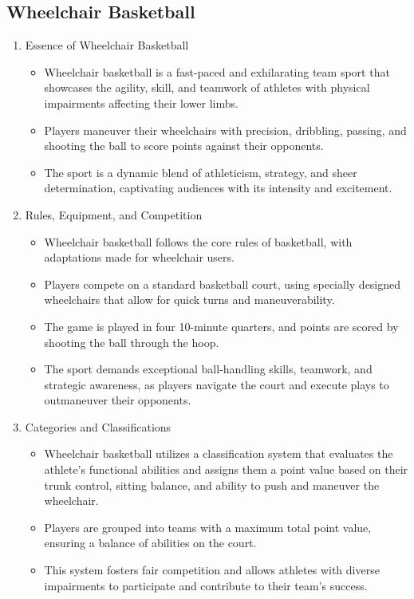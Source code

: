 \subsection{Wheelchair Basketball}

\begin{enumerate}

\item Essence of Wheelchair Basketball
    \begin{itemize}
    \item Wheelchair basketball is a fast-paced and exhilarating team sport that showcases the agility, skill, and teamwork of athletes with physical impairments affecting their lower limbs. 
    \item Players maneuver their wheelchairs with precision, dribbling, passing, and shooting the ball to score points against their opponents. 
    \item The sport is a dynamic blend of athleticism, strategy, and sheer determination, captivating audiences with its intensity and excitement.
    \end{itemize}

\item Rules, Equipment, and Competition
    \begin{itemize}
    \item Wheelchair basketball follows the core rules of basketball, with adaptations made for wheelchair users. 
    \item Players compete on a standard basketball court, using specially designed wheelchairs that allow for quick turns and maneuverability. 
    \item The game is played in four 10-minute quarters, and points are scored by shooting the ball through the hoop. 
    \item The sport demands exceptional ball-handling skills, teamwork, and strategic awareness, as players navigate the court and execute plays to outmaneuver their opponents.
    \end{itemize}

\item Categories and Classifications
    \begin{itemize}
    \item Wheelchair basketball utilizes a classification system that evaluates the athlete's functional abilities and assigns them a point value based on their trunk control, sitting balance, and ability to push and maneuver the wheelchair. 
    \item Players are grouped into teams with a maximum total point value, ensuring a balance of abilities on the court. 
    \item This system fosters fair competition and allows athletes with diverse impairments to participate and contribute to their team's success.
    \end{itemize}

\end{enumerate}